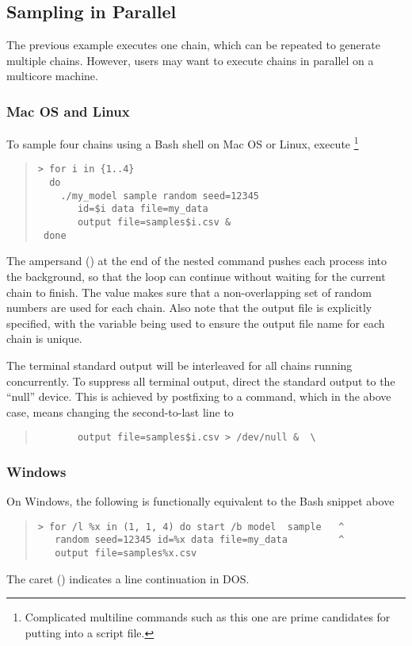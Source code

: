 \subsection{Sampling in Parallel}

The previous example executes one chain, which can be repeated to 
generate multiple chains. However, users may want to execute chains
in parallel on a multicore machine. 

\subsubsection{Mac OS and Linux}

To sample four chains using a Bash shell on Mac OS or Linux, execute%
%
\footnote{Complicated multiline commands such as this one are prime candidates for putting into a script file.}
%
\begin{quote}
\begin{Verbatim}[fontshape=sl]
> for i in {1..4}
  do
    ./my_model sample random seed=12345
       id=$i data file=my_data
       output file=samples$i.csv &
 done
\end{Verbatim}
\end{quote}
%
The ampersand (\code{\&}) at the end of the nested command pushes each process into the background, so that the loop can continue without waiting for the current chain to finish.  The  value makes sure that a non-overlapping set of random numbers are used for each chain.  Also note that the output file is explicitly specified, with the variable  being used to ensure the output file name for each chain is unique.

The terminal standard output will be interleaved for all chains
running concurrently.  To suppress all terminal output, direct the
standard output to the ``null'' device.  This is achieved by
postfixing  to a command, which in the above case,
means changing the second-to-last line to 
\begin{quote}
\begin{Verbatim}
       output file=samples$i.csv > /dev/null &  \
\end{Verbatim}
\end{quote}



\subsubsection{Windows}

On Windows, the following is functionally equivalent to the Bash
snippet above
%
\begin{quote}
\begin{Verbatim}[fontshape=sl]
> for /l %x in (1, 1, 4) do start /b model  sample   ^
   random seed=12345 id=%x data file=my_data         ^
   output file=samples%x.csv 
\end{Verbatim}
\end{quote}
%
The caret (\code{\textasciicircum}) indicates a line continuation in
DOS.

